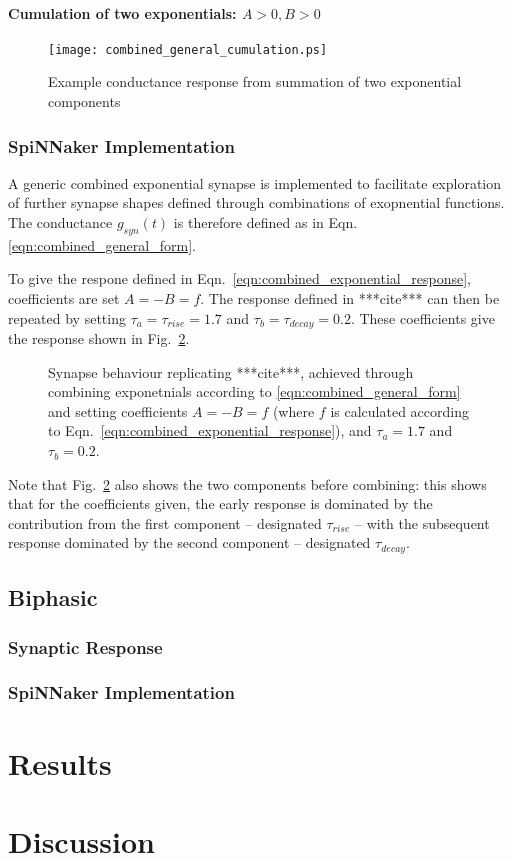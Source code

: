 \documentclass[12pt]{article}
\begin{document}
\paragraph{Cumulation of two exponentials: $A>0, B>0$}
\begin{figure}[!h]
\begin{centering}
\texttt{[image: combined\_general\_cumulation.ps]}
\caption{Example conductance response from summation of two exponential
components}
\label{fig:combined_exp_example}
\end{centering}
\end{figure}

\subsubsection*{SpiNNaker Implementation}
A generic combined exponential synapse is implemented to facilitate exploration
of further synapse shapes defined through combinations of exopnential
functions. The conductance $g_{syn}(t)$ is therefore defined as in
Eqn.\ref{eqn:combined_general_form}.

To give the respone defined in Eqn.~\ref{eqn:combined_exponential_response},
coefficients are set $A=-B=f$. The response defined in ***cite*** can then be
repeated by setting $\tau_a = \tau_{rise} = 1.7$ and $\tau_b = \tau_{decay} =
0.2$. These coefficients give the response shown in Fig.~\ref{fig:typical_response}.
\begin{figure}
\caption{Synapse behaviour replicating ***cite***, achieved through combining
exponetnials according to \ref{eqn:combined_general_form} and setting coefficients
$A=-B=f$ (where $f$ is calculated according to Eqn.~\ref{eqn:combined_exponential_response}), and $\tau_a = 1.7$ and $\tau_b = 0.2$.}
\label{fig:typical_response}
\end{figure}
Note that Fig.~\ref{fig:typical_response} also shows the two components before
combining: this shows that for the coefficients given, the early response is
dominated by the contribution from the first component -- designated
$\tau_{rise}$ -- with the subsequent response dominated by the second component
-- designated $\tau_{decay}$.


\subsection{Biphasic}
\subsubsection*{Synaptic Response}
\subsubsection*{SpiNNaker Implementation}

\section{Results}

\section{Discussion}
\end{document}
